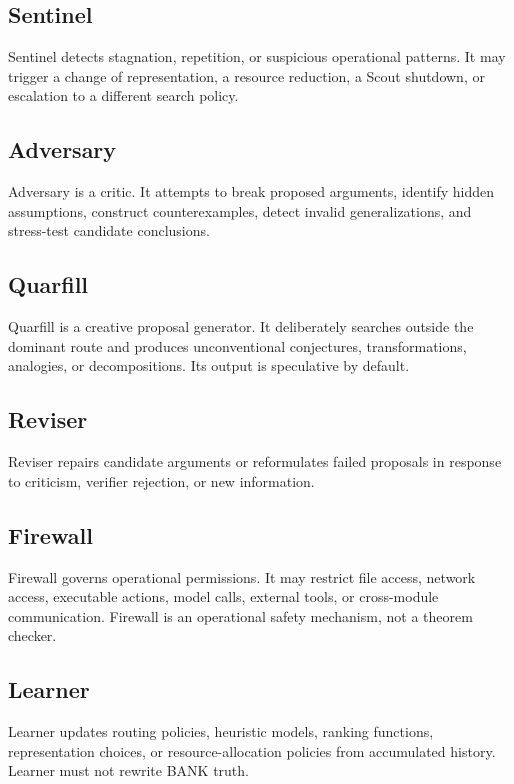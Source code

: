 \documentclass[11pt]{article}
\begin{document}
\subsection{Sentinel}

Sentinel detects stagnation, repetition, or suspicious operational patterns. It may trigger a change of representation, a resource reduction, a Scout shutdown, or escalation to a different search policy.

\subsection{Adversary}

Adversary is a critic. It attempts to break proposed arguments, identify hidden assumptions, construct counterexamples, detect invalid generalizations, and stress-test candidate conclusions.

\subsection{Quarfill}

Quarfill is a creative proposal generator. It deliberately searches outside the dominant route and produces unconventional conjectures, transformations, analogies, or decompositions. Its output is speculative by default.

\subsection{Reviser}

Reviser repairs candidate arguments or reformulates failed proposals in response to criticism, verifier rejection, or new information.

\subsection{Firewall}

Firewall governs operational permissions. It may restrict file access, network access, executable actions, model calls, external tools, or cross-module communication. Firewall is an operational safety mechanism, not a theorem checker.

\subsection{Learner}

Learner updates routing policies, heuristic models, ranking functions, representation choices, or resource-allocation policies from accumulated history. Learner must not rewrite BANK truth.
\end{document}
